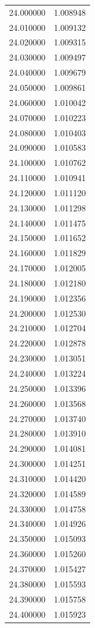 \begin{tabular}{rr}
24.000000 & 1.008948 \\
24.010000 & 1.009132 \\
24.020000 & 1.009315 \\
24.030000 & 1.009497 \\
24.040000 & 1.009679 \\
24.050000 & 1.009861 \\
24.060000 & 1.010042 \\
24.070000 & 1.010223 \\
24.080000 & 1.010403 \\
24.090000 & 1.010583 \\
24.100000 & 1.010762 \\
24.110000 & 1.010941 \\
24.120000 & 1.011120 \\
24.130000 & 1.011298 \\
24.140000 & 1.011475 \\
24.150000 & 1.011652 \\
24.160000 & 1.011829 \\
24.170000 & 1.012005 \\
24.180000 & 1.012180 \\
24.190000 & 1.012356 \\
24.200000 & 1.012530 \\
24.210000 & 1.012704 \\
24.220000 & 1.012878 \\
24.230000 & 1.013051 \\
24.240000 & 1.013224 \\
24.250000 & 1.013396 \\
24.260000 & 1.013568 \\
24.270000 & 1.013740 \\
24.280000 & 1.013910 \\
24.290000 & 1.014081 \\
24.300000 & 1.014251 \\
24.310000 & 1.014420 \\
24.320000 & 1.014589 \\
24.330000 & 1.014758 \\
24.340000 & 1.014926 \\
24.350000 & 1.015093 \\
24.360000 & 1.015260 \\
24.370000 & 1.015427 \\
24.380000 & 1.015593 \\
24.390000 & 1.015758 \\
24.400000 & 1.015923 \\

\end{tabular}
